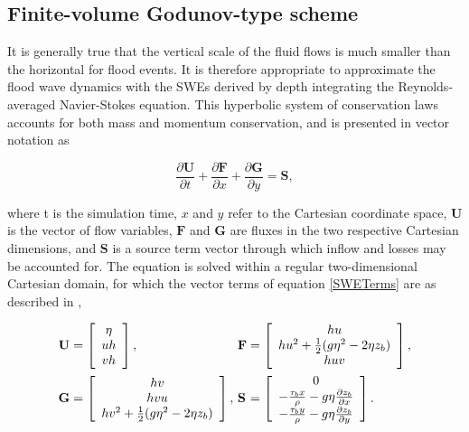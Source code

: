 \subsection{Finite-volume Godunov-type scheme}

It is generally true that the vertical scale of the fluid flows is much smaller than the horizontal for flood events. It is therefore appropriate to approximate the flood wave dynamics with the SWEs derived by depth integrating the Reynolds-averaged Navier-Stokes equation. This hyperbolic system of conservation laws accounts for both mass and momentum conservation, and is presented in vector notation as

\begin{equation}
	\label{SWE}
	\frac{\partial\textbf{U}}{\partial t} +
	\frac{\partial\textbf{F}}{\partial x} +
	\frac{\partial\textbf{G}}{\partial y} =
	\textbf{S} ,
\end{equation}

where t is the simulation time, \(x\) and \(y\) refer to the Cartesian coordinate space, \(\textbf{U}\) is the vector of flow variables, \(\textbf{F}\) and \(\textbf{G}\) are fluxes in the two respective Cartesian dimensions, and \(\textbf{S}\) is a source term vector through which inflow and losses may be accounted for. The equation is solved within a regular two-dimensional Cartesian domain, for which the vector terms of equation \eqref{SWETerms} are as described in \citet{Liang2009b}, 
 
\begin{equation}
	\label{SWETerms}
	\begin{alignedat}{4}
		&\textbf U && = \left[ \begin{array}{c}
			\eta \\
			uh \\
			vh
		\end{array} \right] , ~ &&
		\textbf F &&  = \left[ \begin{array}{c}
			hu \\
			hu^2 + \frac{1}{2}(g\eta^2 - 2\eta z_b) \\
			huv
		\end{array} \right] ,\\
		&\textbf G && = \left[ \begin{array}{c}
			hv \\
			hvu \\
			hv^2 + \frac{1}{2}(g\eta^2 - 2\eta z_b) \\
		\end{array} \right] , ~ &&
		\textbf S && = \left[ \begin{array}{c}
			0 \\
			-\frac{\tau_bx}{\rho} - g\eta \frac{\partial z_b}{\partial x} \\
			-\frac{\tau_by}{\rho} - g\eta \frac{\partial z_b}{\partial y} \\
		\end{array} \right] .
	\end{alignedat}
\end{equation}


